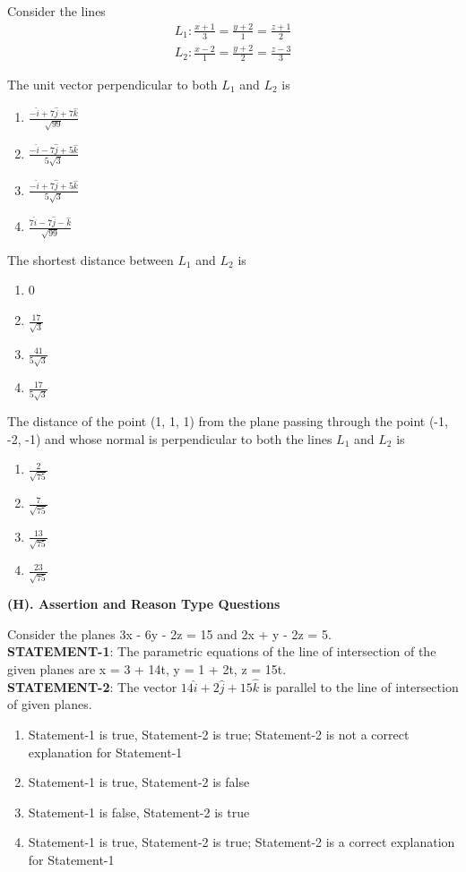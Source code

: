 Consider the lines
\begin{align*}
L_1: \frac{x + 1}{3} = \frac{y + 2}{1} = \frac{z + 1}{2}
\end{align*}
\begin{align*}
L_2: \frac{x - 2}{1}=\frac{y + 2}{2} = \frac{z - 3}{3}
\end{align*}
\item The unit vector perpendicular to both $L_1$ and $L_2$ is
\begin{enumerate}
\item $\frac{-\hat{i} + 7\hat{j} + 7\hat{k}}{\sqrt{99}}$
\item $\frac{-\hat{i} - 7\hat{j} + 5\hat{k}}{5\sqrt{3}}$
\item $\frac{-\hat{i} + 7\hat{j} + 5\hat{k}}{5\sqrt{3}}$
\item $\frac{7\hat{i} - 7\hat{j} - \hat{k}}{\sqrt{99}}$
\end{enumerate}

\item The shortest distance between $L_1$ and $L_2$ is
\begin{enumerate}
\item 0
\item $\frac{17}{\sqrt{3}}$
\item $\frac{41}{5\sqrt{3}}$
\item $\frac{17}{5\sqrt{3}}$
\end{enumerate}

\item The distance of the point (1, 1, 1) from the plane passing through the point (-1, -2, -1) and whose normal is perpendicular to both the lines $L_1$ and $L_2$ is
\begin{enumerate}
\item $\frac{2}{\sqrt{75}}$
\item $\frac{7}{\sqrt{75}}$
\item $\frac{13}{\sqrt{75}}$
\item $\frac{23}{\sqrt{75}}$
\end{enumerate}

\textbf{(H). Assertion and Reason Type Questions}

\item Consider the planes 3x - 6y - 2z = 15 and 2x + y - 2z = 5.\\
\textbf{STATEMENT-1}: The parametric equations of the line of intersection of the given planes are x = 3 + 14t, y = 1 + 2t, z = 15t.\\
\textbf{STATEMENT-2}: The vector $14\hat{i} + 2\hat{j} + 15\hat{k}$ is parallel to the line of intersection of given planes.
\begin{enumerate}
\item Statement-1 is true, Statement-2 is true; Statement-2 is not a correct explanation for Statement-1
\item Statement-1 is true, Statement-2 is false
\item Statement-1 is false, Statement-2 is true
\item Statement-1 is true, Statement-2 is true; Statement-2 is a correct explanation for Statement-1
\end{enumerate}

